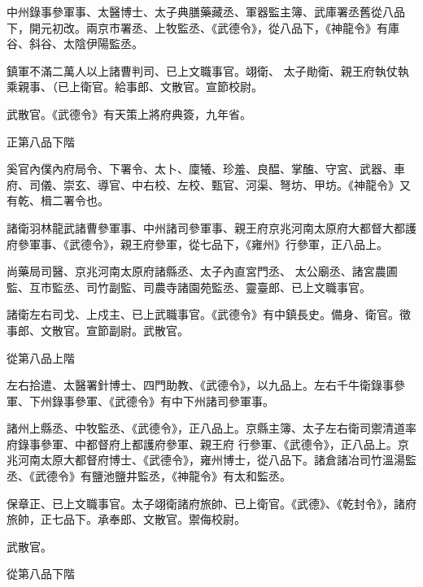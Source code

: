 \begin{pinyinscope}
 中州錄事參軍事、太醫博士、太子典膳藥藏丞、軍器監主簿、武庫署丞舊從八品下，開元初改。兩京市署丞、上牧監丞、《武德令》，從八品下，《神龍令》有庫谷、斜谷、太陰伊陽監丞。



 鎮軍不滿二萬人以上諸曹判司、已上文職事官。翊衛、
 太子勛衛、親王府執仗執乘親事、（已上衛官。給事郎、文散官。宣節校尉。



 武散官。《武德令》有天策上將府典簽，九年省。



 正第八品下階



 奚官內僕內府局令、下署令、太卜、廩犧、珍羞、良醖、掌醢、守宮、武器、車府、司儀、崇玄、導官、中右校、左校、甄官、河渠、弩坊、甲坊。《神龍令》又有乾、楫二署令也。



 諸衛羽林龍武諸曹參軍事、中州諸司參軍事、親王府京兆河南太原府大都督大都護府參軍事、《武德令》，親王府參軍，從七品下，《雍州》行參軍，正八品上。



 尚藥局司醫、京兆河南太原府諸縣丞、太子內直宮門丞、
 太公廟丞、諸宮農圃監、互市監丞、司竹副監、司農寺諸園苑監丞、靈臺郎、已上文職事官。



 諸衛左右司戈、上戍主、已上武職事官。《武德令》有中鎮長史。備身、衛官。徵事郎、文散官。宣節副尉。武散官。



 從第八品上階



 左右拾遣、太醫署針博士、四門助教、《武德令》，以九品上。左右千牛衛錄事參軍、下州錄事參軍、《武德令》有中下州諸司參軍事。



 諸州上縣丞、中牧監丞、《武德令》，正八品上。京縣主簿、太子左右衛司禦清道率府錄事參軍、中都督府上都護府參軍、親王府
 行參軍、《武德令》，正八品上。京兆河南太原大都督府博士、《武德令》，雍州博士，從八品下。諸倉諸冶司竹溫湯監丞、《武德令》有鹽池鹽井監丞，《神龍令》有太和監丞。



 保章正、已上文職事官。太子翊衛諸府旅帥、已上衛官。《武德》、《乾封令》，諸府旅帥，正七品下。承奉郎、文散官。禦侮校尉。



 武散官。



 從第八品下階




\end{pinyinscope}
